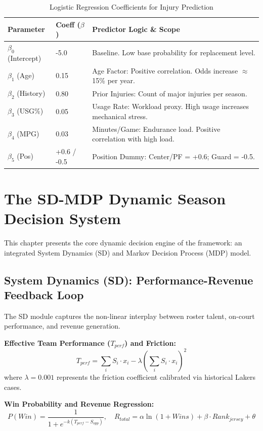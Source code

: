 \documentclass[12pt]{article}
\begin{document}
\begin{table}[H]
\centering
\caption{Logistic Regression Coefficients for Injury Prediction}
\begin{tabular}{lll}
\toprule
\textbf{Parameter} & \textbf{Coeff ($\beta$)} & \textbf{Predictor Logic \& Scope} \\
\midrule
$\beta_0$ (Intercept) & -5.0 & Baseline. Low base probability for replacement level. \\
$\beta_1$ (Age) & 0.15 & Age Factor: Positive correlation. Odds increase $\approx$ 15\% per year. \\
$\beta_2$ (History) & 0.80 & Prior Injuries: Count of major injuries per season. \\
$\beta_3$ (USG\%) & 0.05 & Usage Rate: Workload proxy. High usage increases mechanical stress. \\
$\beta_4$ (MPG) & 0.03 & Minutes/Game: Endurance load. Positive correlation with high load. \\
$\beta_5$ (Pos) & +0.6 / -0.5 & Position Dummy: Center/PF = +0.6; Guard = -0.5. \\
\bottomrule
\end{tabular}
\end{table}

\section{The SD-MDP Dynamic Season Decision System}
This chapter presents the core dynamic decision engine of the framework: an integrated System Dynamics (SD) and Markov Decision Process (MDP) model.

\subsection{System Dynamics (SD): Performance-Revenue Feedback Loop}
The SD module captures the non-linear interplay between roster talent, on-court performance, and revenue generation.

\textbf{Effective Team Performance ($T_{perf}$) and Friction:}
\begin{equation}
T_{perf} = \sum_{i} S_i \cdot x_i - \lambda \left( \sum_{i} S_i \cdot x_i \right)^2
\end{equation}
where $\lambda = 0.001$ represents the friction coefficient calibrated via historical Lakers cases.

\textbf{Win Probability and Revenue Regression:}
\begin{equation}
P(Win) = \frac{1}{1 + e^{-k(T_{perf} - S_{opp})}}, \quad R_{total} = \alpha \ln(1 + Wins) + \beta \cdot Rank_{jersey} + \theta
\end{equation}
\end{document}
